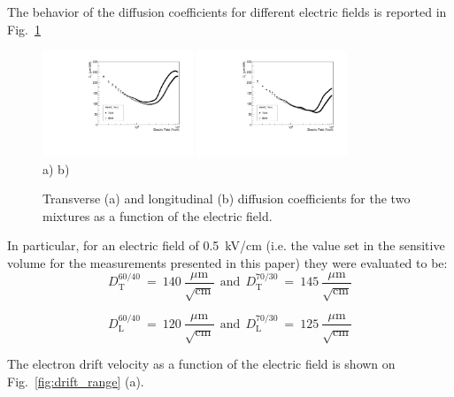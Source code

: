\documentclass[a4paper,11pt]{article}
\begin{document}
The behavior of the diffusion coefficients for different electric fields is reported in Fig.~\ref{fig:diff}
%
\begin{figure}[ht]
\centering
\includegraphics[width=0.4\textwidth]{Figures/gDT_renga.pdf}
\includegraphics[width=0.4\textwidth]{Figures/gDL_renga.pdf}\\
\vspace{-0.3cm}
\mbox{a)} \hspace{5.5cm} \mbox{b)}
\vspace{-0.3cm}
\caption{Transverse (a) and longitudinal (b) diffusion coefficients for the two mixtures as a function of the electric field.}
\label{fig:diff}
\end{figure}
%
In particular, for an electric field of 0.5~kV/cm (i.e. the value set in the sensitive volume for the measurements presented in this paper) they were evaluated to be:
$$
D_{\mathrm{T}}^{60/40}~=~140~\frac{\mu{\mathrm{m}}}{\sqrt{\mathrm{cm}}}
{\mathrm{~~and~~}} 
D_{\mathrm{T}}^{70/30}~=~145~\frac{\mu{\mathrm{m}}}{\sqrt{\mathrm{cm}}}
$$

$$
D_{\mathrm{L}}^{60/40}~=~120~\frac{\mu{\mathrm{m}}}{\sqrt{\mathrm{cm}}}
{\mathrm{~~and~~}} 
D_{\mathrm{L}}^{70/30}~=~125~\frac{\mu{\mathrm{m}}}{\sqrt{\mathrm{cm}}}
$$


The electron drift velocity as a function of the electric field is shown on Fig.~\ref{fig:drift_range} (a).
\end{document}
